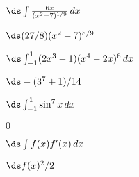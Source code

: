 \begin{enumialphparenastyle}
\begin{ex}
 $\ds\int {6x\over(x^2 - 7)^{1/9}}\,dx$
\begin{sol}
 $\ds (27/8)(x^2-7)^{8/9}$
\end{sol}
\end{ex}

\begin{ex}
 $\ds\int_{-1}^1 (2x^3-1)(x^4-2x)^6\,dx$
\begin{sol}
 $\ds -(3^7+1)/14$
\end{sol}
\end{ex}

\begin{ex}
 $\ds\int_{-1}^1 \sin^7 x\,dx$
\begin{sol}
 $0$
\end{sol}
\end{ex}

\begin{ex}
 $\ds\int f(x) f'(x)\,dx$ 
\begin{sol}
 $\ds f(x)^2/2$
\end{sol}
\end{ex}

\end{enumialphparenastyle}